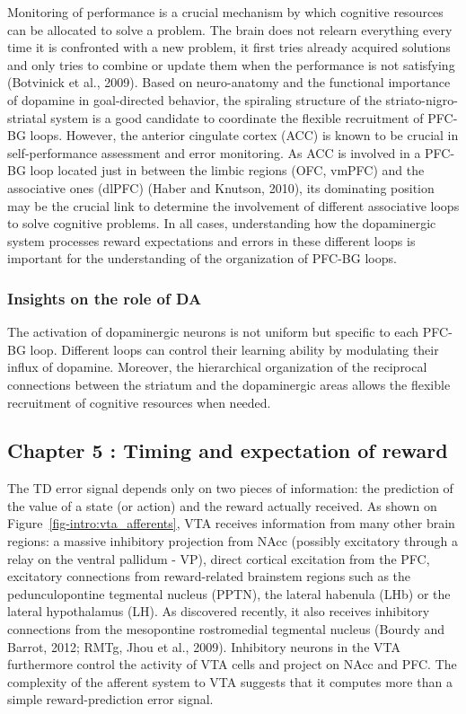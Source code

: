 \documentclass[
  11pt,
  a4paper,
]{scrbook}
\begin{document}
Monitoring of performance is a crucial mechanism by which cognitive
resources can be allocated to solve a problem. The brain does not
relearn everything every time it is confronted with a new problem, it
first tries already acquired solutions and only tries to combine or
update them when the performance is not satisfying (Botvinick et al.,
2009). Based on neuro-anatomy and the functional importance of dopamine
in goal-directed behavior, the spiraling structure of the
striato-nigro-striatal system is a good candidate to coordinate the
flexible recruitment of PFC-BG loops. However, the anterior cingulate
cortex (ACC) is known to be crucial in self-performance assessment and
error monitoring. As ACC is involved in a PFC-BG loop located just in
between the limbic regions (OFC, vmPFC) and the associative ones (dlPFC)
(Haber and Knutson, 2010), its dominating position may be the crucial
link to determine the involvement of different associative loops to
solve cognitive problems. In all cases, understanding how the
dopaminergic system processes reward expectations and errors in these
different loops is important for the understanding of the organization
of PFC-BG loops.

\subsubsection*{Insights on the role of
DA}\label{insights-on-the-role-of-da-2}

The activation of dopaminergic neurons is not uniform but specific to
each PFC-BG loop. Different loops can control their learning ability by
modulating their influx of dopamine. Moreover, the hierarchical
organization of the reciprocal connections between the striatum and the
dopaminergic areas allows the flexible recruitment of cognitive
resources when needed.

\subsection{Chapter 5 : Timing and expectation of
reward}\label{chapter-5-timing-and-expectation-of-reward}

The TD error signal depends only on two pieces of information: the
prediction of the value of a state (or action) and the reward actually
received. As shown on Figure~\ref{fig-intro:vta_afferents}, VTA receives
information from many other brain regions: a massive inhibitory
projection from NAcc (possibly excitatory through a relay on the ventral
pallidum - VP), direct cortical excitation from the PFC, excitatory
connections from reward-related brainstem regions such as the
pedunculopontine tegmental nucleus (PPTN), the lateral habenula (LHb) or
the lateral hypothalamus (LH). As discovered recently, it also receives
inhibitory connections from the mesopontine rostromedial tegmental
nucleus (Bourdy and Barrot, 2012; RMTg, Jhou et al., 2009). Inhibitory
neurons in the VTA furthermore control the activity of VTA cells and
project on NAcc and PFC. The complexity of the afferent system to VTA
suggests that it computes more than a simple reward-prediction error
signal.
\end{document}
